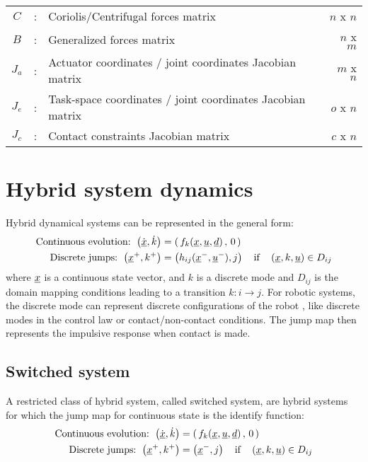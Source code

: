 \begin{table}[htbp]
\begin{tabular}{ c c l r }
		$C$             &  :  & Coriolis/Centrifugal forces matrix                         & $n$ x $n$ \\
		$B$             &  :  & Generalized forces matrix                                  & $n$ x $m$ \\
		$J_a$           &  :  & Actuator coordinates / joint coordinates Jacobian matrix   & $m$ x $n$ \\
		$J_e$           &  :  & Task-space coordinates / joint coordinates Jacobian matrix & $o$ x $n$ \\
		$J_c$           &  :  & Contact constraints Jacobian matrix                        & $c$ x $n$  \\
		\hline \hline
	\end{tabular}
	\label{tab:nom}
\end{table}




\newpage
\section{Hybrid system dynamics}

Hybrid dynamical systems can be represented in the general form:
%
\begin{align}
	\text{Continuous evolution: } \left(  \dot{\underline{x}} , \dot{k} \right) &=  \left( \, f_k( \underline{x} , \underline{u} , \underline{d} ) \, , \, 0 \, \right) \\
	\text{Discrete jumps: } \left(  \underline{x}^+ , k^+ \right) &=  \left( h_{ij}( \underline{x}^- , \underline{u}^- ) , j \right) \quad\text{if}\quad \left(  \underline{x} , k , \underline{u} \right) \in D_{ij}
\end{align}
%
where $\underline{x}$ is a continuous state vector, and $k$ is a discrete mode and $D_{ij}$ is the domain mapping conditions leading to a transition $k:i \rightarrow j$. For robotic systems, the discrete mode can represent discrete configurations of the robot , like discrete modes in the control law or contact/non-contact conditions. The jump map then represents the impulsive response when contact is made.

\subsection{Switched system}

A restricted class of hybrid system, called switched system, are hybrid systems for which the jump map for continuous state is the identify function:
%
\begin{align}
	\text{Continuous evolution: } \left(  \dot{\underline{x}} , \dot{k} \right) &=  \left( \, f_k( \underline{x} , \underline{u} , \underline{d} ) \, , \, 0 \, \right) \\
	\text{Discrete jumps: } \left(  \underline{x}^+ , k^+ \right) &=  \left( \underline{x}^- , j \right) \quad\text{if}\quad \left(  \underline{x} , k , \underline{u} \right) \in D_{ij}
\end{align}
%

